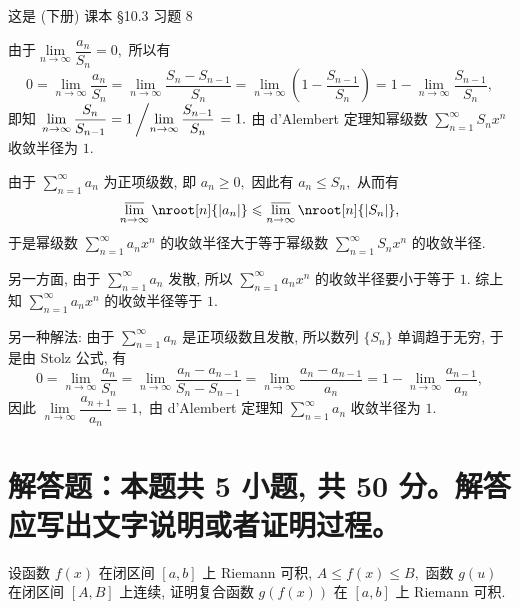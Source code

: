 \begin{solution}
  这是 (下册) 课本 \S 10.3 习题 8

  由于$\lim\limits_{n\to\infty} \dfrac{a_n}{S_n} = 0,$ 所以有
  $$0 = \lim\limits_{n\to\infty} \dfrac{a_n}{S_n} = \lim\limits_{n\to\infty} \dfrac{S_n - S_{n-1}}{S_n} = \lim\limits_{n\to\infty} \left( 1 - \dfrac{S_{n-1}}{S_n} \right) = 1 - \lim\limits_{n\to\infty} \dfrac{S_{n-1}}{S_n},$$
  即知 $\lim\limits_{n\to\infty} \dfrac{S_n}{S_{n-1}} = 1 \left/ \lim\limits_{n\to\infty} \dfrac{S_{n-1}}{S_n} \right. = 1.$ 由 d'Alembert 定理知幂级数 $\sum\limits_{n=1}^{\infty} S_n x^n$ 收敛半径为 $1.$

  由于 $\sum\limits_{n=1}^{\infty} a_n$ 为正项级数, 即 $a_n \geqslant 0,$ 因此有 $a_n \leqslant S_n,$ 从而有
  $$\varlimsup_{n\to\infty} \nroot[n]{\lvert a_n \rvert} \leqslant \varlimsup_{n\to\infty} \nroot[n]{\lvert S_n \rvert},$$
  于是幂级数 $\sum\limits_{n=1}^{\infty} a_n x^n$ 的收敛半径大于等于幂级数 $\sum\limits_{n=1}^{\infty} S_n x^n$ 的收敛半径.

  另一方面, 由于 $\sum\limits_{n=1}^{\infty} a_n$ 发散, 所以 $\sum\limits_{n=1}^{\infty} a_n x^n$ 的收敛半径要小于等于 $1.$ 综上知 $\sum\limits_{n=1}^{\infty} a_n x^n$ 的收敛半径等于 $1.$

  另一种解法: 由于 $\sum\limits_{n=1}^{\infty} a_n$ 是正项级数且发散, 所以数列 $\{S_n\}$ 单调趋于无穷, 于是由 Stolz 公式, 有
  $$0 = \lim\limits_{n\to\infty} \dfrac{a_n}{S_n} = \lim\limits_{n\to\infty} \dfrac{a_n-a_{n-1}}{S_n-S_{n-1}} = \lim\limits_{n\to\infty} \dfrac{a_n-a_{n-1}}{a_n} = 1 -\lim\limits_{n\to\infty} \dfrac{a_{n-1}}{a_n},$$
  因此 $\lim\limits_{n\to\infty} \dfrac{a_{n+1}}{a_n} = 1,$ 由 d'Alembert 定理知 $\sum\limits_{n=1}^{\infty} a_n$ 收敛半径为 $1.$
\end{solution}


\section{解答题：本题共 5 小题, 共 50 分。解答应写出文字说明或者证明过程。}


\begin{question}[points = 8]
  设函数 $f(x)$ 在闭区间 $[a, b]$ 上 Riemann 可积, $A \leqslant f(x) \leqslant B,$ 函数 $g(u)$ 在闭区间 $[A, B]$ 上连续, 证明复合函数 $g(f(x))$ 在 $[a, b]$ 上 Riemann 可积.

\end{question}


